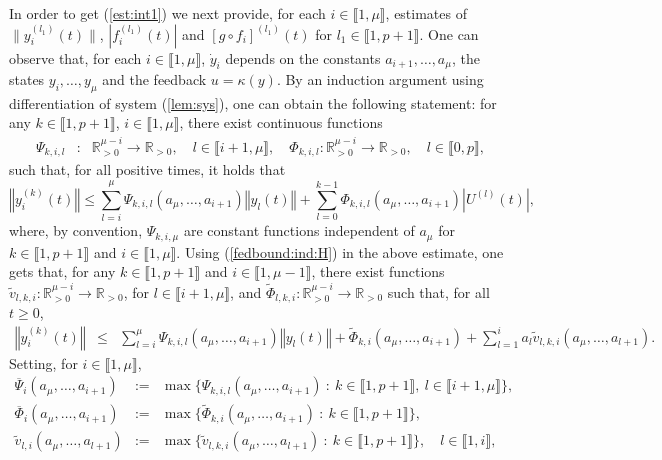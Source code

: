 \documentclass[letterpaper, 10pt]{article}
\newcommand{\rref}[1]{(\ref{#1})}
\newcommand{\norme}[1]{\left\Vert #1\right\Vert}
\newcommand{\abs}[1]{\left| #1 \right|}
\newcommand{\reels}{\mathbb{R}}
\begin{document}
In order to get \rref{est:int1} we next provide,  for each $i \in \llbracket 1 , \mu \rrbracket$, estimates of $\|y_i^{(l_1)}(t)\|$, $|f^{(l_1)}_i (t)|$ and $[g \circ f_i]^{(l_1)}(t) $ for $l_1 \in \llbracket 1 , p+1 \rrbracket$. One can observe that, for each $i \in \llbracket 1 , \mu \rrbracket$, $\dot{y}_i$ depends on the constants $a_{i+1}, \ldots , a_\mu$, the states $y_i , \ldots , y_\mu$ and the feedback $u=\kappa(y)$. By an induction argument using differentiation of system \rref{lem:sys}, one can obtain the following statement: for any $k \in \llbracket 1 , p+1 \rrbracket $, $i \in \llbracket 1 , \mu  \rrbracket $, there exist continuous functions 
\begin{eqnarray*}
\Psi_{k,i,l} & : & \reels^{\mu - i}_{>0} \rightarrow \reels_{>0}, \quad l \in \llbracket i+1 , \mu  \rrbracket ,\quad \Phi_{k,i,l} : \reels^{\mu - i}_{>0} \rightarrow \reels_{>0}, \quad l \in \llbracket 0 , p  \rrbracket ,
\end{eqnarray*} such that, for all positive times, it holds that
\begin{equation*}
\norme{y_i^{(k)}(t)} \leq  \sum\limits_{l  =i}^{\mu } \Psi_{k,i,l}(a_\mu , \ldots , a_{i+1}) \norme{y_l(t)} +  \sum\limits_{l  =0}^{k-1} \Phi_{k,i,l}(a_\mu , \ldots , a_{i+1}) \abs{U^{(l)}(t)},
\end{equation*} 
where, by convention, $\Psi_{k,i,\mu}$ are constant functions independent of $a_\mu$ for $k \in \llbracket 1 , p+1 \rrbracket $ and $i \in \llbracket 1 , \mu  \rrbracket $. Using \rref{fedbound:ind:H} in the above estimate, one gets that, for any $k \in \llbracket 1 , p+1 \rrbracket $ and $i \in \llbracket 1 , \mu-1  \rrbracket $, there exist functions $\tilde{v}_{l,k,i} : \reels^{\mu - i}_{>0} \rightarrow \reels_{>0}$, for $ l \in \llbracket i+1 , \mu  \rrbracket $, and $\tilde{\Phi}_{l,k,i} : \reels^{\mu - i}_{>0} \rightarrow \reels_{>0}$ such that, for all $t \geq 0$,
\begin{eqnarray*}
\norme{y_i^{(k)}(t)} & \leq & \sum\limits_{l  =i}^{\mu } \Psi_{k,i,l}(a_\mu , \ldots , a_{i+1}) \norme{y_l(t)} + \tilde{\Phi}_{k,i}(a_\mu , \ldots , a_{i+1})   +  \sum\limits_{l  =1}^{i} a_l  \tilde{v}_{l,k,i}(a_\mu , \ldots , a_{l+1}).
\end{eqnarray*} 
Setting, for $i \in \llbracket 1 , \mu  \rrbracket$, 
\begin{eqnarray*}
\overline{\Psi}_i(a_\mu , \ldots , a_{i+1}) & := & \max \lbrace  \Psi_{k,i,l}(a_\mu , \ldots , a_{i+1}) \: : \: k \in \llbracket 1, p+1 \rrbracket , \:  l \in \llbracket i+1 , \mu \rrbracket \rbrace , \\
\overline{\Phi}_i(a_\mu , \ldots , a_{i+1}) & := & \max \lbrace \tilde{\Phi}_{k,i}(a_\mu , \ldots , a_{i+1} ) \: : \: k \in \llbracket 1, p+1 \rrbracket  \rbrace ,  \\
\tilde{v}_{l ,i} (a_\mu , \ldots , a_{l+1}) & := & \max \lbrace \tilde{v}_{l ,k,i}(a_\mu , \ldots , a_{l+1}) \: : \: k \in \llbracket 1, p+1 \rrbracket  \rbrace , \quad l \in \llbracket 1 , i \rrbracket,
\end{eqnarray*} 
\end{document}
